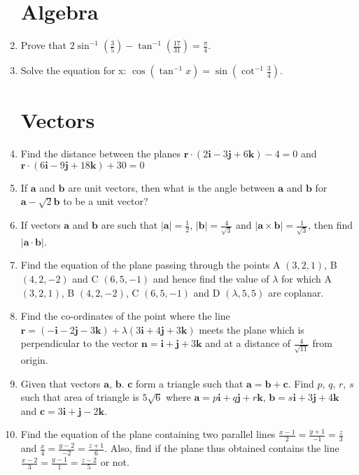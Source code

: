 \documentclass[10pt,-letter paper]{article}
\let\vec\mathbf{}
\let\vec\mathbf{}
\let\vec\mathbf{}
\providecommand{\brak}[1]{\ensuremath{\left(#1\right)}}
\providecommand{\abs}[1]{\left\vert#1\right\vert}
\begin{document}
\begin{enumerate}
\section{Algebra}
\item Prove that $2\sin^{-1}\brak{\frac{3}{5}}-\tan^{-1}\brak{\frac{17}{31}} = \frac{\pi}{4}$.
\item Solve the equation for x: $\cos\brak{\tan^{-1}x} = \sin\brak{\cot^{-1}\frac{3}{4}}$. 
\section{Vectors}
\item Find the distance between the planes $\vec{r} \cdot (2\vec{i} - 3\vec{j} + 6\vec{k}) - 4 = 0$ and $\vec{r} \cdot (6\vec{i} - 9\vec{j} + 18\vec{k}) + 30 = 0$
\item If $\vec{a}$ and $\vec{b}$ are unit vectors, then what is the angle between $\vec{a}$ and $\vec{b}$ for $\vec{a} - \sqrt{2}\vec{b}$ to be a unit vector?
\item If vectors $\vec{a}$ and $\vec{b}$ are such that $\abs{\vec{a}} = \frac{1}{2}$, $\abs{\vec{b}} = \frac{4}{\sqrt{3}}$ and $\abs{\vec{a}\times \vec{b}} = \frac{1}{\sqrt{3}}$, then find $\abs{\vec{a} \cdot \vec{b}}$.
\item Find the equation of the plane passing through the points A $(3, 2, 1)$, B $(4, 2, -2)$ and C $(6, 5, -1)$ and hence find the value of $\lambda$ for which A $(3, 2, 1)$, B $(4, 2, -2)$, C $(6, 5, -1)$ and D $(\lambda, 5, 5)$ are coplanar.
\item Find the co-ordinates of the point where the line $\vec{r} = (-\vec{i}-2\vec{j}-3\vec{k}) + \lambda(3\vec{i}+4\vec{j}+3\vec{k})$ meets the plane which is perpendicular to the vector $\vec{n} = \vec{i} + \vec{j} + 3\vec{k}$ and at a distance of $\frac{4}{\sqrt{11}}$ from origin. 
\item Given that vectors $\vec{a}$, $\vec{b}$. $\vec{c}$ form a triangle such that $\vec{a} = \vec{b} + \vec{c}$. Find $p$, $q$, $r$, $s$ such that area of triangle is $5\sqrt{6}$ where $\vec{a} = p\vec{i} + q\vec{j} + r\vec{k}$, $\vec{b} = s\vec{i} + 3\vec{j} + 4\vec{k}$ and $\vec{c} = 3\vec{i} + \vec{j} - 2\vec{k}$.
\item Find the equation of the plane containing two parallel lines $\frac{x-1}{2} = \frac{y+1}{-1} = \frac{z}{3}$ and $\frac{x}{4} = \frac{y-2}{-2} = \frac{z+1}{6}$. Also, find if the plane thus obtained contains the line $\frac{x - 2}{3} = \frac{y - 1}{1} = \frac{z-2}{5}$ or not.

\end{enumerate}
\end{document}
